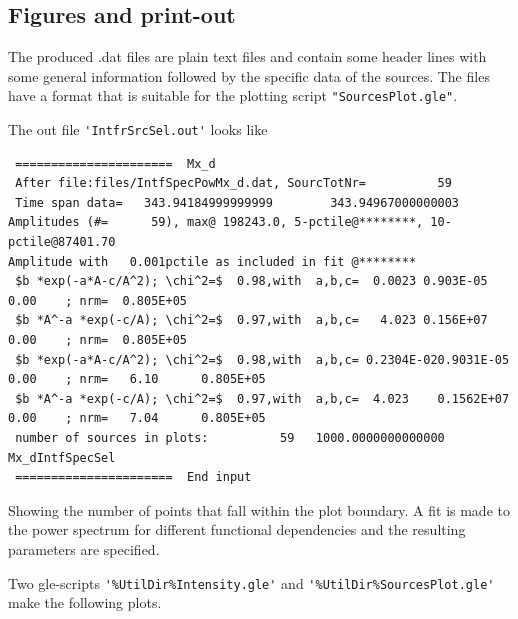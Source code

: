 \subsection{Figures and print-out}%

The produced .dat files are plain text files and contain some header lines with some general information followed by the specific data of the sources. The files have a format that is suitable for the plotting script \verb!"SourcesPlot.gle"!. 

The out file \verb#'IntfrSrcSel.out'# looks like

\begin{linenumbers}
\tiny
\resetlinenumber
\begin{verbatim}
 ======================  Mx_d
 After file:files/IntfSpecPowMx_d.dat, SourcTotNr=          59
 Time span data=   343.94184999999999        343.94967000000003
Amplitudes (#=      59), max@ 198243.0, 5-pctile@********, 10-pctile@87401.70
Amplitude with   0.001pctile as included in fit @********
 $b *exp(-a*A-c/A^2); \chi^2=$  0.98,with  a,b,c=  0.0023 0.903E-05   0.00    ; nrm=  0.805E+05
 $b *A^-a *exp(-c/A); \chi^2=$  0.97,with  a,b,c=   4.023 0.156E+07   0.00    ; nrm=  0.805E+05
 $b *exp(-a*A-c/A^2); \chi^2=$  0.98,with  a,b,c= 0.2304E-020.9031E-05   0.00    ; nrm=   6.10      0.805E+05
 $b *A^-a *exp(-c/A); \chi^2=$  0.97,with  a,b,c=  4.023    0.1562E+07   0.00    ; nrm=   7.04      0.805E+05
 number of sources in plots:          59   1000.0000000000000      Mx_dIntfSpecSel
 ======================  End input
\end{verbatim}
\end{linenumbers}

Showing the number of points that fall within the plot boundary. A fit is made to the power spectrum for different functional dependencies and the resulting parameters are specified.

Two gle-scripts \verb#'%UtilDir%Intensity.gle'# and \verb#'%UtilDir%SourcesPlot.gle'# make the following plots.

